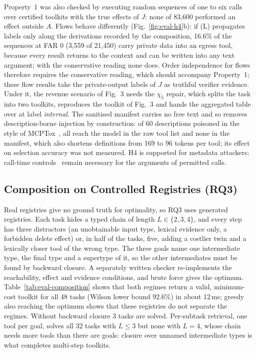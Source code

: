 Property~1 was also checked by executing random sequences of one to six calls over certified toolkits with the
true effects of $J$: none of 83,600 performed an effect outside $A$. Flows behave differently
(Fig.~\ref{fig:eval-h4}b): if (L) propagates labels only along the derivations recorded by the composition,
16.6\% of the sequences at FAR 0 (3,559 of 21,450) carry private data into an egress tool, because every
result returns to the context and can be written into any text argument; with the conservative reading none
does. Order independence for flows therefore requires the conservative reading, which should accompany
Property~1; these flow results take the private-output labels of $J$ as truthful verifier evidence. Under it, the
revenue scenario of Fig.~3 needs the $\chi_5$ repair, which splits the task into two toolkits, reproduces the
toolkit of Fig.~3 and hands the aggregated table over at label \emph{internal}. The sanitised manifest carries no free text and so removes description-borne injection by
construction: of 60 descriptions poisoned in the style of MCPTox~\cite{wang2025mcptox}, all reach the model in
the raw tool list and none in the manifest, which also shortens definitions from 169 to 96 tokens per tool; its
effect on selection accuracy was not measured. H4 is supported for metadata attackers; call-time
controls~\cite{debenedetti2025camel,costa2025fides,shi2025progent} remain necessary for the arguments of
permitted calls.

\subsection{Composition on Controlled Registries (RQ3)}
\label{sec:eval-rq3}



Real registries give no ground truth for optimality, so RQ3 uses generated registries. Each task hides a typed
chain of length $L\in\{2,3,4\}$, and every step has three distractors (an unobtainable input type, lexical
evidence only, a forbidden delete effect) or, in half of the tasks, five, adding a costlier twin and a
lexically closer tool of the wrong type. The three goals name one intermediate type, the final type and a
supertype of it, so the other intermediates must be found by backward closure. A separately written checker
re-implements the reachability, effect and evidence conditions, and brute force gives the optimum.
Table~\ref{tab:eval-composition} shows that both regimes return a valid, minimum-cost toolkit for all 48 tasks
(Wilson lower bound 92.6\%) in about 12\,ms; greedy also reaching the optimum shows that these registries do
not separate the regimes. Without backward closure 3 tasks are solved. Per-subtask
retrieval, one tool per goal, solves all 32 tasks with $L\le3$ but none with $L=4$, whose chain needs more
tools than there are goals: closure over unnamed intermediate types is what completes multi-step toolkits.

